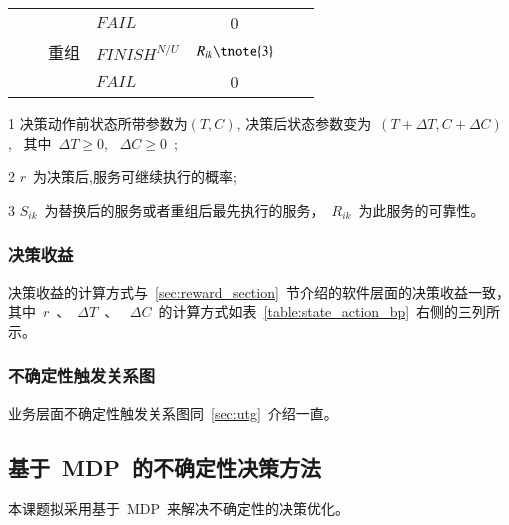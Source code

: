 \begin{table}[htbp]
\begin{threeparttable}
\begin{tabular}{clclccc}
        {}
        & {}
        & {} 
        & {$FAIL$} 
        & {0}
        & {} 
        & {} \\
        
        {}
        & {}
        & {重组} 
        & {$FINISH^{N/U}$} 
        & $R_{ik}\tnote{3}$ 
        & {\multirow{2}{*}{$T_{i0}+\sum\limits_{x = i}^j {({T_{xk}} - {T_{x0}})} $}}
        & {\multirow{2}{*}{$C_{i0}+\sum\limits_{x = i}^j {({C_{xk}} - {C_{x0}})} $}} \\
        
        
        {}
        & {}
        & {} 
        & {$FAIL$} 
        & {0}
        & {} 
        & {} \\

        \bottomrule
    \end{tabular}%
    
    \begin{tablenotes}
        \item[1] 决策动作前状态所带参数为$(T,C)$, 决策后状态参数变为~$(T+\Delta T, C+\Delta C)$,~ 其中~$\Delta T \ge 0$, ~$\Delta C \ge 0$~; 
        \item[2] $r$~为决策后,服务可继续执行的概率;
        \item[3] $S_{ik}$~为替换后的服务或者重组后最先执行的服务，~$R_{ik}$~为此服务的可靠性。
    \end{tablenotes}
\end{threeparttable}
\end{table}%

\subsubsection{决策收益}

决策收益的计算方式与~\ref{sec:reward_section}~节介绍的软件层面的决策收益一致，其中~$r$~、~$\Delta T$~、 ~$\Delta C$~的计算方式如表~\ref{table:state_action_bp}~右侧的三列所示。

\subsubsection{不确定性触发关系图}

业务层面不确定性触发关系图同~\ref{sec:utg}~介绍一直。

\subsection{基于~MDP~的不确定性决策方法}

本课题拟采用基于~MDP~来解决不确定性的决策优化。

